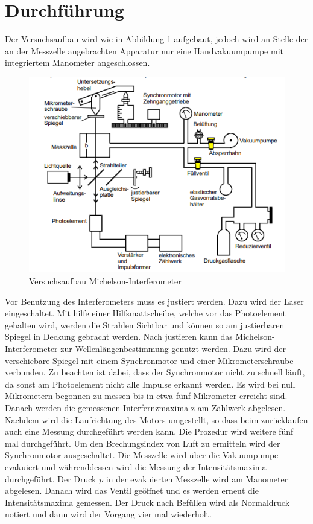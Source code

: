 \section{Durchführung}
\label{sec:Durchführung}
Der Versuchsaufbau wird wie in Abbildung \ref{fig:Vmi} aufgebaut, jedoch wird an Stelle der an der Messzelle angebrachten Apparatur nur eine Handvakuumpumpe mit integriertem Manometer angeschlossen.
\begin{figure}
    \centering
    \caption{Versuchsaufbau Michelson-Interferometer \cite{v401}}
    \label{fig:Vmi}
    \includegraphics[width = 0.5 \textwidth]{pics/aufbauvv.png}
\end{figure}
Vor Benutzung des Interferometers muss es justiert werden. Dazu wird der Laser eingeschaltet.
Mit hilfe einer Hilfsmattscheibe, welche vor das Photoelement gehalten wird, werden die Strahlen Sichtbar und können so am justierbaren Spiegel in Deckung gebracht werden.
Nach justieren kann das Michelson-Interferometer zur Wellenlängenbestimmung genutzt werden. Dazu wird der verschiebare Spiegel mit einem Synchronmotor und einer Mikrometerschraube verbunden.
Zu beachten ist dabei, dass der Synchronmotor nicht zu schnell läuft, da sonst am Photoelement nicht alle Impulse erkannt werden. Es wird bei null Mikrometern begonnen zu messen bis in etwa fünf Mikrometer erreicht sind.
Danach werden die gemessenen Interfernzmaxima z am Zählwerk abgelesen. Nachdem wird die Laufrichtung des Motors umgestellt, so dass beim zurücklaufen auch eine Messung durchgeführt werden kann.
Die Prozedur wird weitere fünf mal durchgeführt.
Um den Brechungsindex von Luft zu ermitteln wird der Synchronmotor ausgeschaltet. Die Messzelle wird über die Vakuumpumpe evakuiert und währenddessen wird die Messung der Intensitätsmaxima durchgeführt.
Der Druck $p$ in der evakuierten Messzelle wird am Manometer abgelesen. Danach wird das Ventil geöffnet und es werden erneut die Intensitätsmaxima gemessen.
Der Druck nach Befüllen wird als Normaldruck notiert und dann wird der Vorgang vier mal wiederholt.
